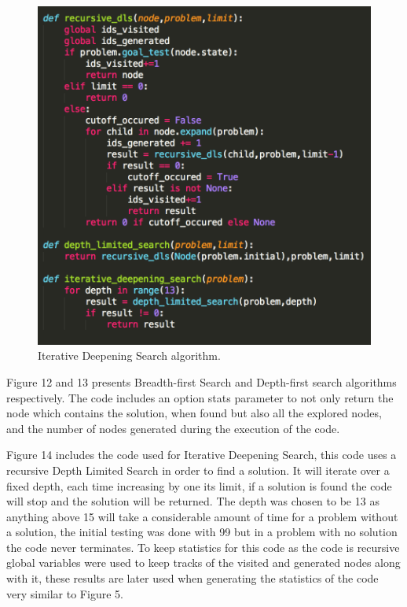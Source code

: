 \documentclass[12pt, letter]{article}
\begin{document}
\begin{figure}[htb]
  \centering
  \includegraphics[width=0.9 \textwidth]{./graphs/iterative_deepening.png}
  \caption{Iterative Deepening Search algorithm.}
\end{figure}

Figure 12 and 13 presents Breadth-first Search and Depth-first search algorithms respectively. The code includes an option stats parameter to not only return the node which contains the solution, when found but also all the explored nodes, and the number of nodes generated during the execution of the code. 

Figure 14 includes the code used for Iterative Deepening Search, this code uses a recursive Depth Limited Search in order to find a solution. It will iterate over a fixed depth, each time increasing by one its limit, if a solution is found the code will stop and the solution will be returned. The depth was chosen to be 13 as anything above 15 will take a considerable amount of time for a problem without a solution, the initial testing was done with 99 but in a problem with no solution the code never terminates. To keep statistics for this code as the code is recursive global variables were used to keep tracks of the visited and generated nodes along with it, these results are later used when generating the statistics of the code very similar to Figure 5. 

\FloatBarrier
\end{document}
